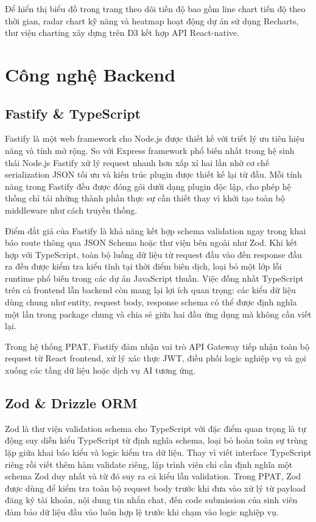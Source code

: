 \documentclass[../main.tex]{subfiles}
\begin{document}
Để hiển thị biểu đồ trong trang theo dõi tiến độ bao gồm line chart tiến độ theo thời gian, radar chart kỹ năng và heatmap hoạt động dự án sử dụng Recharts, thư viện charting xây dựng trên D3 kết hợp API React-native.

\section{Công nghệ Backend}

\subsection{Fastify \& TypeScript}

Fastify là một web framework cho Node.js được thiết kế với triết lý ưu tiên hiệu năng và tính mở rộng. So với Express framework phổ biến nhất trong hệ sinh thái Node.js Fastify xử lý request nhanh hơn xấp xỉ hai lần nhờ cơ chế serialization JSON tối ưu và kiến trúc plugin được thiết kế lại từ đầu. Mỗi tính năng trong Fastify đều được đóng gói dưới dạng plugin độc lập, cho phép hệ thống chỉ tải những thành phần thực sự cần thiết thay vì khởi tạo toàn bộ middleware như cách truyền thống.

Điểm đắt giá của Fastify là khả năng kết hợp schema validation ngay trong khai báo route thông qua JSON Schema hoặc thư viện bên ngoài như Zod. Khi kết hợp với TypeScript, toàn bộ luồng dữ liệu từ request đầu vào đến response đầu ra đều được kiểm tra kiểu tĩnh tại thời điểm biên dịch, loại bỏ một lớp lỗi runtime phổ biến trong các dự án JavaScript thuần. Việc đồng nhất TypeScript trên cả frontend lẫn backend còn mang lại lợi ích quan trọng: các kiểu dữ liệu dùng chung như entity, request body, response schema có thể được định nghĩa một lần trong package chung và chia sẻ giữa hai đầu ứng dụng mà không cần viết lại.

Trong hệ thống PPAT, Fastify đảm nhận vai trò API Gateway tiếp nhận toàn bộ request từ React frontend, xử lý xác thực JWT, điều phối logic nghiệp vụ và gọi xuống các tầng dữ liệu hoặc dịch vụ AI tương ứng.

\subsection{Zod \& Drizzle ORM}

Zod là thư viện validation schema cho TypeScript với đặc điểm quan trọng là tự động suy diễn kiểu TypeScript từ định nghĩa schema, loại bỏ hoàn toàn sự trùng lặp giữa khai báo kiểu và logic kiểm tra dữ liệu. Thay vì viết interface TypeScript riêng rồi viết thêm hàm validate riêng, lập trình viên chỉ cần định nghĩa một schema Zod duy nhất và từ đó suy ra cả kiểu lẫn validation. Trong PPAT, Zod được dùng để kiểm tra toàn bộ request body trước khi đưa vào xử lý từ payload đăng ký tài khoản, nội dung tin nhắn chat, đến code submission của sinh viên đảm bảo dữ liệu đầu vào luôn hợp lệ trước khi chạm vào logic nghiệp vụ.
\end{document}
